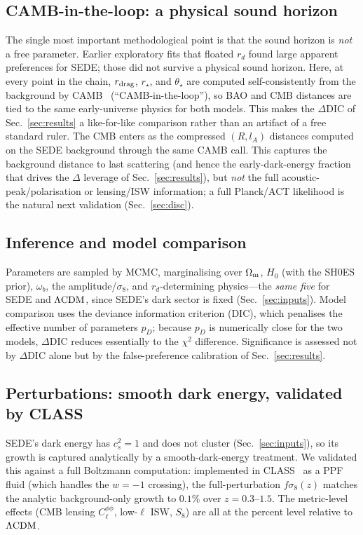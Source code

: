 \subsection{CAMB-in-the-loop: a physical sound horizon}
The single most important methodological point is that the sound horizon is \emph{not} a free
parameter. Earlier exploratory fits that floated $r_d$ found large apparent preferences for SEDE; those
did not survive a physical sound horizon. Here, at every point in the chain, $r_{\rm drag}$,
$r_\star$, and $\theta_\star$ are computed self-consistently from the background by
CAMB~\cite{Lewis:1999bs} (``CAMB-in-the-loop''), so BAO and CMB distances are tied to the same
early-universe physics for both models. This makes the $\Delta\mathrm{DIC}$ of Sec.~\ref{sec:results} a
like-for-like comparison rather than an artifact of a free standard ruler. The CMB enters as the
compressed $(R,l_A)$ distances computed on the SEDE background through the same CAMB call. This
captures the background distance to last scattering (and hence the early-dark-energy fraction that
drives the $\Delta$ leverage of Sec.~\ref{sec:results}), but \emph{not} the full
acoustic-peak/polarisation or lensing/ISW information; a full Planck/ACT likelihood is the natural next
validation (Sec.~\ref{sec:disc}).

\subsection{Inference and model comparison}
Parameters are sampled by MCMC, marginalising over $\Omega_{\mathrm m}$, $H_0$ (with the SH0ES prior), $\omega_b$, the
amplitude/$\sigma_8$, and $r_d$-determining physics---the \emph{same five} for SEDE and $\Lambda\mathrm{CDM}$, since
SEDE's dark sector is fixed (Sec.~\ref{sec:inputs}). Model comparison uses the deviance information
criterion (DIC), which penalises the effective number of parameters $p_D$; because $p_D$ is
numerically close for the two models, $\Delta\mathrm{DIC}$ reduces essentially to the $\chi^2$
difference. Significance is assessed not by $\Delta\mathrm{DIC}$ alone but by the false-preference
calibration of Sec.~\ref{sec:results}.

\subsection{Perturbations: smooth dark energy, validated by CLASS}
SEDE's dark energy has $c_s^2=1$ and does not cluster (Sec.~\ref{sec:inputs}), so its growth is
captured analytically by a smooth-dark-energy treatment. We validated this against a full Boltzmann
computation: implemented in CLASS~\cite{Blas:2011rf} as a PPF fluid (which handles the $w=-1$
crossing), the full-perturbation $f\sigma_8(z)$ matches the analytic background-only growth to $0.1\%$
over $z=0.3$--$1.5$. The metric-level effects (CMB lensing $C_\ell^{\phi\phi}$, low-$\ell$ ISW,
$S_8$) are all at the percent level relative to $\Lambda\mathrm{CDM}$.
